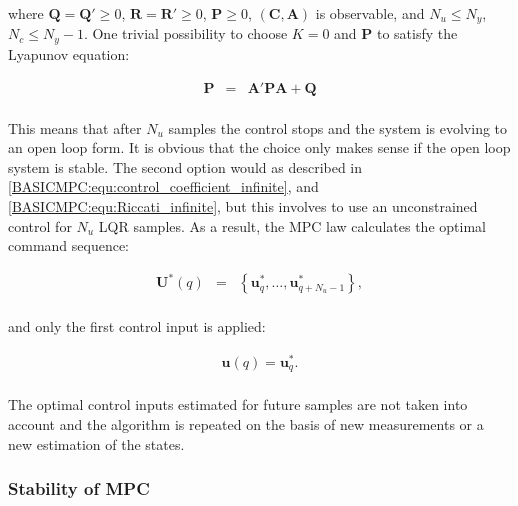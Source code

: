 		where $\textbf{Q}=\textbf{Q}'\geq0$, $\textbf{R}=\textbf{R}'\geq0$, $\textbf{P}\geq0$, $(\textbf{C},\textbf{A})$ is observable, and $N_u\leq N_y$, $N_c\leq N_y-1$. One trivial possibility to choose $K=0$ and $\textbf{P}$ to satisfy the Lyapunov equation:
		
		\begin{equation}
        \begin{array}{rcl}
				\textbf{P}&=&\textbf{A}'\textbf{PA}+\textbf{Q}\\
        \end{array}
        \label{BASICMPC:equ:receiding_horison_Lyapunov}
    \end{equation}
		
		This means that after $N_u$ samples the control stops and the system is evolving to an open loop form. It is obvious that the choice only makes sense if the open loop system is stable. The second option would as described in \ref{BASICMPC:equ:control_coefficient_infinite}, and \ref{BASICMPC:equ:Riccati_infinite}, but this involves to use an unconstrained control for $N_u$ LQR samples. As a result, the MPC law calculates the optimal command sequence:
		
		\begin{equation}
        \begin{array}{rcl}
				\textbf{U}^*(q)&=&\left\{\textbf{u}^*_q,\dots,\textbf{u}^*_{q+N_u-1}\right\},\\
        \end{array}
        \label{BASICMPC:equ:receiding_optimal_sequence}
    \end{equation}
		
		and only the first control input is applied:
		
		\begin{equation}
        \begin{array}{rcl}
				\textbf{u}(q)=\textbf{u}^*_q.\\
        \end{array}
        \label{BASICMPC:equ:receiding_optimal_first}
    \end{equation}
		
		The optimal control inputs estimated for future samples are not taken into account and the algorithm is
repeated on the basis of new measurements or a new estimation of the states.	
    
    \subsubsection{Stability of MPC}\label{BASICCSR:sec:MPCStability}
    
